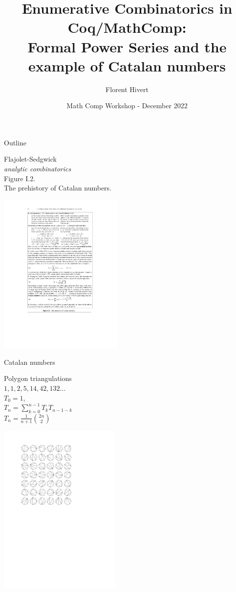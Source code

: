 \documentclass[compress,11pt]{beamer}
\title{\bf\LARGE Enumerative Combinatorics in Coq/MathComp: \\
  Formal Power Series and the example of Catalan numbers}
\author{Florent Hivert}
\institute[LISN]{
  LISN / Université Paris Saclay / CNRS}
\date[December 2022]{Math Comp Workshop - December 2022}
\begin{document}
\frame{\titlepage}

\begin{frame}{Outline}

  \tableofcontents
\end{frame}

\begin{frame}[fragile]
  \parbox{4cm}{Flajolet-Sedgwick\\
    \textit{analytic combinatorics}\\
    Figure I.2. \\
    The prehistory of Catalan numbers.
  }\quad
  \includegraphics[align=c, trim=4.5cm 8.6cm 5cm 2.4cm, clip, width=6.2cm]{FlPage.pdf}
\end{frame}

\begin{frame}{Catalan numbers}

  \parbox{4cm}{
    \begin{center}
      Polygon triangulations\\[5mm]

      $1,1,2,5,14,42,132\dots$\\[3mm]
      $T_0=1$,\\[2mm]

      $\displaystyle T_n=\sum_{k=0}^{n-1}T_kT_{n-1-k}$\\[3mm]

      $\displaystyle T_n=\frac{1}{n+1}\binom{2n}{2}$
    \end{center}
  }\quad
  \includegraphics[align=c, trim=3cm 15cm 8cm 2.4cm, clip,
  width=6cm]{triangle.pdf}
\end{frame}
\end{document}
